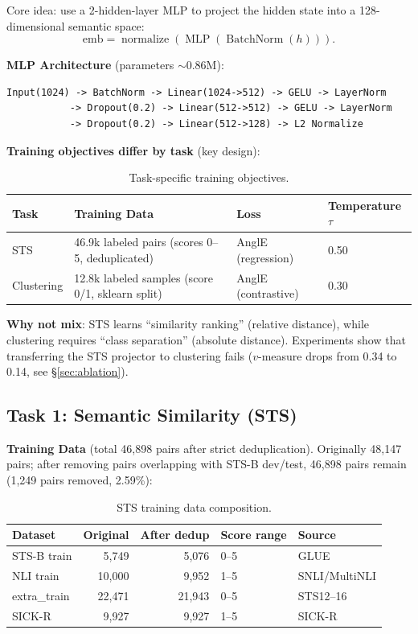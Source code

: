 \documentclass[11pt]{article}
\begin{document}
Core idea: use a 2-hidden-layer MLP to project the hidden state into a
128-dimensional semantic space:
\begin{equation}
\text{emb} = \operatorname{normalize}(\operatorname{MLP}(\operatorname{BatchNorm}(h))).
\end{equation}

\textbf{MLP Architecture} (parameters $\sim$0.86M):
\begin{verbatim}
Input(1024) -> BatchNorm -> Linear(1024->512) -> GELU -> LayerNorm
           -> Dropout(0.2) -> Linear(512->512) -> GELU -> LayerNorm
           -> Dropout(0.2) -> Linear(512->128) -> L2 Normalize
\end{verbatim}

\textbf{Training objectives differ by task} (key design):

\begin{table}[h]
\centering
\begin{tabular}{llll}
\toprule
Task & Training Data & Loss & Temperature $\tau$ \\
\midrule
STS & 46.9k labeled pairs (scores 0--5, deduplicated) & AnglE (regression) & 0.50 \\
Clustering & 12.8k labeled samples (score 0/1, sklearn split) & AnglE (contrastive) & 0.30 \\
\bottomrule
\end{tabular}
\caption{Task-specific training objectives.}
\end{table}

\textbf{Why not mix}: STS learns ``similarity ranking'' (relative distance),
while clustering requires ``class separation'' (absolute distance).
Experiments show that transferring the STS projector to clustering fails
($v$-measure drops from 0.34 to 0.14, see \S\ref{sec:ablation}).

\subsection{Task 1: Semantic Similarity (STS)}

\textbf{Training Data} (total 46,898 pairs after strict deduplication).
Originally 48,147 pairs; after removing pairs overlapping with STS-B
dev/test, 46,898 pairs remain (1,249 pairs removed, 2.59\%):

\begin{table}[h]
\centering
\begin{tabular}{lrrll}
\toprule
Dataset & Original & After dedup & Score range & Source \\
\midrule
STS-B train & 5,749 & 5,076 & 0--5 & GLUE \\
NLI train & 10,000 & 9,952 & 1--5 & SNLI/MultiNLI \\
extra\_train & 22,471 & 21,943 & 0--5 & STS12--16 \\
SICK-R & 9,927 & 9,927 & 1--5 & SICK-R \\
\bottomrule
\end{tabular}
\caption{STS training data composition.}
\end{table}
\end{document}
